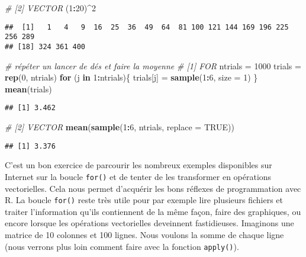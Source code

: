 \documentclass[]{book}
\newenvironment{Shaded}{\begin{snugshade}}{\end{snugshade}}
\newcommand{\KeywordTok}[1]{\textcolor[rgb]{0.13,0.29,0.53}{\textbf{#1}}}
\newcommand{\DataTypeTok}[1]{\textcolor[rgb]{0.13,0.29,0.53}{#1}}
\newcommand{\DecValTok}[1]{\textcolor[rgb]{0.00,0.00,0.81}{#1}}
\newcommand{\StringTok}[1]{\textcolor[rgb]{0.31,0.60,0.02}{#1}}
\newcommand{\CommentTok}[1]{\textcolor[rgb]{0.56,0.35,0.01}{\textit{#1}}}
\newcommand{\OtherTok}[1]{\textcolor[rgb]{0.56,0.35,0.01}{#1}}
\newcommand{\ControlFlowTok}[1]{\textcolor[rgb]{0.13,0.29,0.53}{\textbf{#1}}}
\newcommand{\OperatorTok}[1]{\textcolor[rgb]{0.81,0.36,0.00}{\textbf{#1}}}
\newcommand{\NormalTok}[1]{#1}
\theoremstyle{definition}
\theoremstyle{definition}
\theoremstyle{definition}
\theoremstyle{remark}
\begin{document}
\begin{Shaded}
\begin{Highlighting}[]
\CommentTok{# [2] VECTOR}
\NormalTok{(}\DecValTok{1}\OperatorTok{:}\DecValTok{20}\NormalTok{)}\OperatorTok{^}\DecValTok{2}
\end{Highlighting}
\end{Shaded}

\begin{verbatim}
##  [1]   1   4   9  16  25  36  49  64  81 100 121 144 169 196 225 256 289
## [18] 324 361 400
\end{verbatim}

\begin{Shaded}
\begin{Highlighting}[]
\CommentTok{# répéter un lancer de dés et faire la moyenne}
\CommentTok{# [1] FOR}
\NormalTok{ntrials =}\StringTok{ }\DecValTok{1000}
\NormalTok{trials =}\StringTok{ }\KeywordTok{rep}\NormalTok{(}\DecValTok{0}\NormalTok{, ntrials)}
\ControlFlowTok{for}\NormalTok{ (j }\ControlFlowTok{in} \DecValTok{1}\OperatorTok{:}\NormalTok{ntrials)\{}
\NormalTok{  trials[j] =}\StringTok{ }\KeywordTok{sample}\NormalTok{(}\DecValTok{1}\OperatorTok{:}\DecValTok{6}\NormalTok{, }\DataTypeTok{size =} \DecValTok{1}\NormalTok{)}
\NormalTok{\}}
\KeywordTok{mean}\NormalTok{(trials)}
\end{Highlighting}
\end{Shaded}

\begin{verbatim}
## [1] 3.462
\end{verbatim}

\begin{Shaded}
\begin{Highlighting}[]
\CommentTok{# [2] VECTOR}
\KeywordTok{mean}\NormalTok{(}\KeywordTok{sample}\NormalTok{(}\DecValTok{1}\OperatorTok{:}\DecValTok{6}\NormalTok{, ntrials, }\DataTypeTok{replace =} \OtherTok{TRUE}\NormalTok{))}
\end{Highlighting}
\end{Shaded}

\begin{verbatim}
## [1] 3.376
\end{verbatim}

C'est un bon exercice de parcourir les nombreux exemples disponibles sur
Internet sur la boucle \texttt{for()} et de tenter de les transformer en
opérations vectorielles. Cela nous permet d'acquérir les bons réflexes
de programmation avec R. La boucle \texttt{for()} reste très utile pour
par exemple lire plusieurs fichiers et traiter l'information qu'ils
contiennent de la même façon, faire des graphiques, ou encore lorsque
les opérations vectorielles deveinnent fastidieuses. Imaginons une
matrice de 10 colonnes et 100 lignes. Nous voulons la somme de chaque
ligne (nous verrons plus loin comment faire avec la fonction
\texttt{apply()}).
\end{document}
